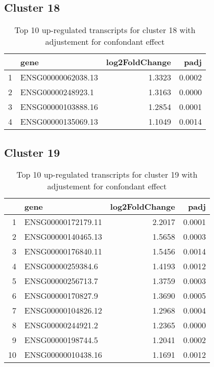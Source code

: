 \documentclass{article}
\begin{document}
\subsection{Cluster 18 }
\begin{table}[H]
\centering
\begin{tabularx}{\textwidth}{rlrr}
  \hline
 & gene & log2FoldChange & padj \\ 
  \hline
1 & ENSG00000062038.13 & 1.3323 & 0.0002 \\ 
  2 & ENSG00000248923.1 & 1.3163 & 0.0000 \\ 
  3 & ENSG00000103888.16 & 1.2854 & 0.0001 \\ 
  4 & ENSG00000135069.13 & 1.1049 & 0.0014 \\ 
   \hline
\end{tabularx}
\caption{Top 10 up-regulated transcripts for cluster 18 with adjustement for confondant effect} 
\label{tab:q3_1_conf_18}
\end{table}
\subsection{Cluster 19 }
\begin{table}[H]
\centering
\begin{tabularx}{\textwidth}{rlrr}
  \hline
 & gene & log2FoldChange & padj \\ 
  \hline
1 & ENSG00000172179.11 & 2.2017 & 0.0001 \\ 
  2 & ENSG00000140465.13 & 1.5658 & 0.0003 \\ 
  3 & ENSG00000176840.11 & 1.5456 & 0.0014 \\ 
  4 & ENSG00000259384.6 & 1.4193 & 0.0012 \\ 
  5 & ENSG00000256713.7 & 1.3759 & 0.0003 \\ 
  6 & ENSG00000170827.9 & 1.3690 & 0.0005 \\ 
  7 & ENSG00000104826.12 & 1.2968 & 0.0004 \\ 
  8 & ENSG00000244921.2 & 1.2365 & 0.0000 \\ 
  9 & ENSG00000198744.5 & 1.2041 & 0.0002 \\ 
  10 & ENSG00000010438.16 & 1.1691 & 0.0012 \\ 
   \hline
\end{tabularx}
\caption{Top 10 up-regulated transcripts for cluster 19 with adjustement for confondant effect} 
\label{tab:q3_1_conf_19}
\end{table}
\end{document}
